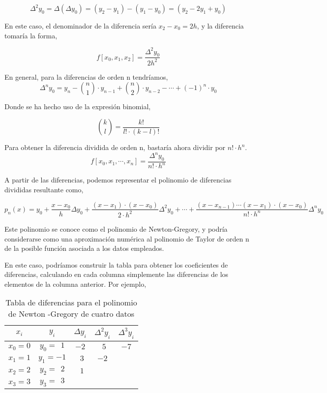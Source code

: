 \begin{equation*}
\Delta^2 y_0=\Delta \left(\Delta y_0 \right) =(y_2-y_1)-(y_1-y_0)=(y_2-2y_1+y_0)
\end{equation*}

En este caso, el denominador de la diferencia sería $x_2-x_0=2h$, y la diferencia tomaría la forma,

\begin{equation*}
f[x_0,x_1,x_2]=\frac{\Delta^2y_0}{2h^2}
\end{equation*}

En general, para la diferencias de orden n tendríamos,
\begin{equation*}
\Delta^n y_0=y_n-\binom{n}{1}\cdot y_{n-1}+\binom{n}{2}\cdot y_{n-2}-\cdots+(-1)^n\cdot y_0
\end{equation*}

Donde se ha hecho uso de la expresión binomial,

\begin{equation*}
\binom{k}{l}=\frac{k!}{l!\cdot(k-l)!}
\end{equation*}

Para obtener la diferencia dividida de orden n, bastaría ahora dividir por $n!\cdot h^n$.
\begin{equation*}
f\left[x_0,x_1,\cdots,x_n\right]=\frac{\Delta^n y_0}{n!\cdot h^n}
\end{equation*}

A partir de las diferencias, podemos representar el polinomio de diferencias divididas resultante como,

\begin{equation*}
p_n(x)=y_0+\frac{x-x_0}{h}\Delta y_0+\frac{(x-x_1)\cdot (x-x_0)}{2\cdot h^2}\Delta^2 y_0+\cdots +\frac{(x-x_{n-1}) \cdots (x-x_1)\cdot (x-x_0)}{n! \cdot h^n}\Delta^n y_0
\end{equation*}

Este polinomio se conoce como el polinomio de Newton-Gregory, y podría considerarse como una aproximación  numérica al polinomio de Taylor de orden n de la posible función asociada a los datos empleados. 

En este caso, podríamos construir la tabla para obtener los coeficientes de diferencias, calculando en cada columna simplemente las diferencias de los elementos de la columna anterior. Por ejemplo,

\begin{table}[h]
\centering
\caption{Tabla de diferencias para el polinomio de Newton -Gregory de cuatro datos}
\begin{tabular}{ccccc}
$x_i$&$y_i$&$\Delta y_i$&$\Delta^2 y_i$&$\Delta^3 y_i$\\
\hline
$x_0=0$&$y_0=\ \  1$&$-2$&$\ \ 5$&$-7$\\
$x_1=1$&$y_1=-1$&$ \ \ 3$&$ -2$\\
$x_2=2$&$y_2=\ \ 2$&$\ \ 1$\\
$x_3=3$&$y_3=\ \ 3$\\

\end{tabular}
\label{tabnewton}
\end{table}

